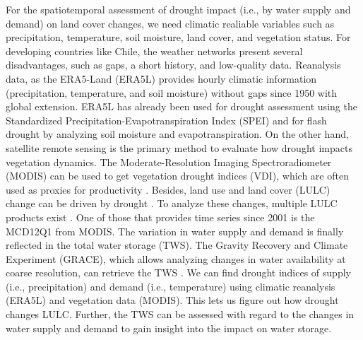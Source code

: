 \documentclass[
  number,
  preprint,
  3p,
  onecolumn]{elsarticle}
\begin{document}
For the spatiotemporal assessment of drought impact (i.e., by water
supply and demand) on land cover changes, we need climatic realiable
variables such as precipitation, temperature, soil moisture, land cover,
and vegetation status. For developing countries like Chile, the weather
networks present several disadvantages, such as gaps, a short history,
and low-quality data. Reanalysis data, as the ERA5-Land (ERA5L)
\citep{MunozSabater2021} provides hourly climatic information
(precipitation, temperature, and soil moisture) without gaps since 1950
with global extension. ERA5L has already been used for drought
assessment using the Standardized Precipitation-Evapotranspiration Index
(SPEI) \citep{Nouri2023} and for flash drought \citep{Wang2023} by
analyzing soil moisture and evapotranspiration. On the other hand,
satellite remote sensing \citep{West2019, AghaKouchak2015} is the
primary method to evaluate how drought impacts vegetation dynamics. The
Moderate-Resolution Imaging Spectroradiometer (MODIS) can be used to get
vegetation drought indices (VDI), which are often used as proxies for
productivity \citep{Paruelo2016, Schucknecht2017}. Besides, land use and
land cover (LULC) change can be driven by drought
\citep{Tran2019, Akinyemi2021}. To analyze these changes, multiple LULC
products exist \citep{Grekousis2015}. One of those that provides time
series since 2001 is the MCD12Q1 \citep{Friedl2019} from MODIS. The
variation in water supply and demand is finally reflected in the total
water storage (TWS). The Gravity Recovery and Climate Experiment
(GRACE), which allows analyzing changes in water availability at coarse
resolution, can retrieve the TWS \citep{Ahmed2014, Ma2017}. We can find
drought indices of supply (i.e., precipitation) and demand (i.e.,
temperature) using climatic reanalysis (ERA5L) and vegetation data
(MODIS). This lets us figure out how drought changes LULC. Further, the
TWS can be assessed with regard to the changes in water supply and
demand to gain insight into the impact on water storage.
\end{document}
